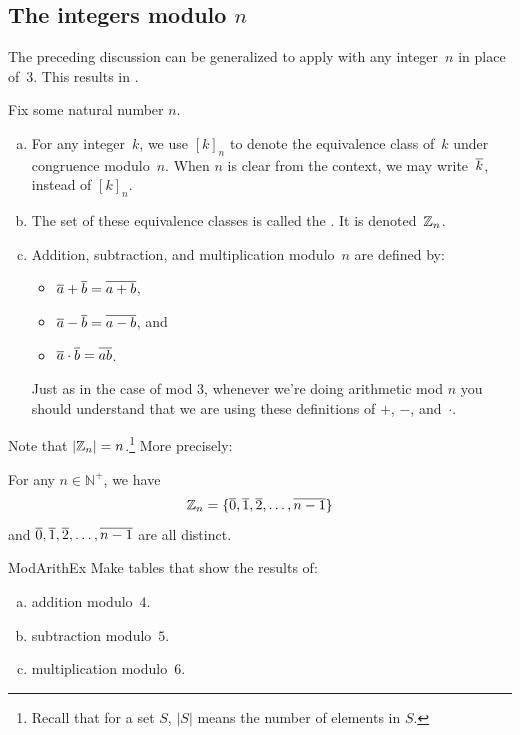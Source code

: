 \subsection{The integers modulo $n$}
The preceding discussion can be generalized to apply with any integer~$n$ in place of~$3$. This results in .

\begin{defn} \label{integ_mod_n}
Fix some natural number $n$.
\begin{enumerate}[(a)]
\item For any integer~$k$, we use $[k]_n$ to denote the equivalence class of~$k$ under congruence modulo~$n$. When $n$ is clear from the context, we may write~$\overline{k}$, instead of $[k]_n$.
\item The set of these equivalence classes is called the . It is denoted~$\mathbb{Z}_n$.

 \item Addition, subtraction, and multiplication modulo~$n$ are defined by:
\begin{itemize}
\item $\overline{a} \mathbin{+} \overline{b} = \overline{a + b}$,
\item $\overline{a} \mathbin{-} \overline{b} = \overline{a - b}$,
and
\item $\overline{a} \cdot \overline{b} = \overline{a  b}$.
\end{itemize}
Just as in the case of mod 3, whenever we're doing arithmetic mod $n$ you should understand that we are using these definitions of  $+$, $-$, and~$\cdot$.
\end{enumerate}
\end{defn}


Note that $\left|\mathbb{Z}_n \right| = n$.\footnote{Recall that for a set $S$, $|S|$ means the number of elements in $S$.} More precisely:

\begin{prop}{}
For any $n \in \mathbb{N}^+$, we have 
	$$\mathbb{Z}_n = \{ \overline{0}, \overline{1}, \overline{2}, \ldots, \overline{n-1} \}$$
and\/ $\overline{0}, \overline{1}, \overline{2}, \ldots, \overline{n-1}$ are all distinct.
\end{prop}


\begin{exercise}{ModArithEx}  
Make tables that show the results of:
\begin{enumerate}[(a)]
\item \label{ModArithEx-tables-addition} 
addition modulo~$4$.
\item \label{ModArithEx-tables-subtraction} 
subtraction modulo~$5$.
\item \label{ModArithEx-tables-multiplication} 
multiplication modulo~$6$.
\end{enumerate}
\end{exercise}

